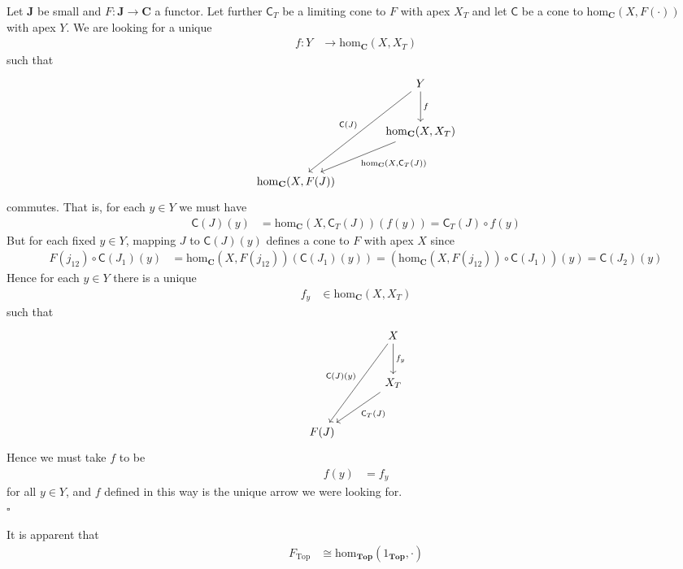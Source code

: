 \begin{prf}
Let $\mathbf{J}$ be small and $F \colon \mathbf{J} \rightarrow \mathbf{C}$ a functor.
Let further $\mathsf{C}_{T}$ be a limiting cone to $F$ with apex $X_{T}$ and let $\mathsf{C}$ be a cone to $\mathrm{hom}_{\mathbf{C}}(X,F(\cdot))$ with apex $Y$.
We are looking for a unique
\begin{align*}
  f
  \colon
  Y
  &\rightarrow
  \mathrm{hom}_{\mathbf{C}}(X,X_{T})
\end{align*}
such that
\[
\begin{tikzcd}[sep=large]
  &
  Y
  \arrow{d}{f}
  \arrow[swap]{ddl}{\mathsf{C}(J)}
  \\
  &
  \mathrm{hom}_{\mathbf{C}}(X,X_{T})
  \arrow{dl}{\mathrm{hom}_{\mathbf{C}}(X,\mathsf{C}_{T}(J))}
  \\
  \mathrm{hom}_{\mathbf{C}}(X,F(J))
\end{tikzcd}
\]
commutes.
That is, for each $y \in Y$ we must have
\begin{align*}
  \mathsf{C}(J)(y)
  &=
  \mathrm{hom}_{\mathbf{C}}(X,\mathsf{C}_{T}(J))(f(y))
  =
  \mathsf{C}_{T}(J)
  \circ
  f(y)
\end{align*}
But for each fixed $y \in Y$, mapping $J$ to $\mathsf{C}(J)(y)$ defines a cone to $F$ with apex $X$ since
\begin{align*}
  F(j_{12})
  \circ
  \mathsf{C}(J_{1})(y)
  &=
  \mathrm{hom}_{\mathbf{C}}(X,F(j_{12}))(\mathsf{C}(J_{1})(y))
  =
  \left(
    \mathrm{hom}_{\mathbf{C}}(X,F(j_{12}))
    \circ
    \mathsf{C}(J_{1})
  \right)
  (y)
  =
  \mathsf{C}(J_{2})(y)
\end{align*}
Hence for each $y \in Y$ there is a unique
\begin{align*}
  f_{y}
  &\in
  \mathrm{hom}_{\mathbf{C}}(X,X_{T})
\end{align*}
such that
\[
\begin{tikzcd}[sep=large]
  &
  X
  \arrow{d}{f_{y}}
  \arrow[swap]{ddl}{\mathsf{C}(J)(y)}
  \\
  &
  X_{T}
  \arrow{dl}{\mathsf{C}_{T}(J)}
  \\
  F(J)
\end{tikzcd}
\]
Hence we must take $f$ to be
\begin{align*}
  f(y)
  &=
  f_{y}
\end{align*}
for all $y \in Y$, and $f$ defined in this way is the unique arrow we were looking for.
\\
\phantom{proven}
\hfill
$\square$
\end{prf}
It is apparent that
\begin{align*}
  F_{\mathrm{Top}}
  &\cong
  \mathrm{hom}_{\mathbf{Top}}(1_{\mathbf{Top}},\cdot)
\end{align*}
